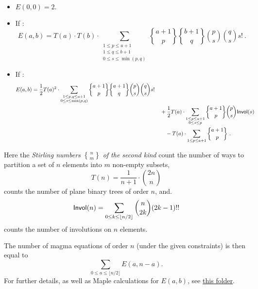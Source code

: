 \begin{itemize}
\item $E(0,0) = 2$.
\item  If :
$$
E(a,b) = T(a)\cdot T(b) \cdot \sum_{\substack{1 \le p \le a+1\\ 1 \le q \le b+1\\0\le s \le \min(p,q)}}
{a+1 \brace p} {b+1 \brace q} {p \choose s} {q \choose s} s! \ .
$$
\item If :
\begin{align*}
E(a,b) = \frac{1}{2} T(a)^2\cdot \sum_{\substack{1 \le p,q \le a+1\\ 0\le s \le \min(p,q)}}
{a+1 \brace p} {a+1 \brace q} {p \choose s} \binom{q}{s} s! \\
&\quad + \frac{1}{2} T(a) \cdot \sum_{\substack{1 \le p \le a+1\\ 0\le s \le p}}
{a+1 \brace p}  \binom{p}{s} {\sf Invol}(s)\\
&\qquad - T(a)\cdot \sum_{1\le p \le a+1}  {a+1 \brace p} \ .
\end{align*}
\end{itemize}

Here the {\it Stirling numbers $n \brace m$ of the second kind} count the number of ways to partition a set of $n$ elements into $m$ non-empty subsets,
$$
T(n) = \frac{1}{n+1} \cdot \binom{2n}{n}
$$
counts the number of plane binary trees of order $n$, and.
$$
{\sf Invol}(n) = \sum_{0 \leq k \leq \lfloor n/2 \rfloor}  {n\choose 2k} (2k-1)!!
$$
counts the number of involutions on $n$ elements.

The number of magma equations of order $n$ (under the given constraints) is then equal to
$$\sum_{0 \le a \le \lfloor n/2 \rfloor } E(a,n-a) .
$$
For further details, as well as Maple calculations for $E(a,b)$, see \href{https://github.com/teorth/equational_theories/tree/main/scripts/count_magma_eqns}{this folder}.
